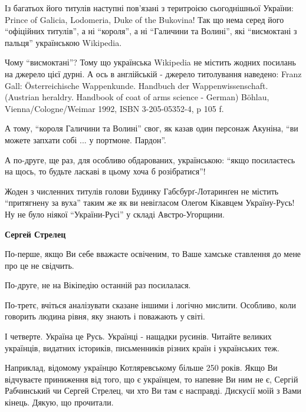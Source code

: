 \begin{itemize}
\begin{itemize}
Із багатьох його титулів наступні пов’язані з теритроією сьогоднішньої України:
Prince of Galicia, Lodomeria, Duke of the Bukovina! Так що нема серед його
\enquote{офіційних титулів}, а ні \enquote{короля}, а ні \enquote{Галичини та Волині}, які \enquote{висмоктані
з пальця} українською Wikipedia.

Чому \enquote{висмоктані}? Тому що українська Wikipedia не містить жодних посилань на
джерело цієї дурні. А ось в англійській - джерело титолування наведено: Franz
Gall: Österreichische Wappenkunde. Handbuch der Wappenwissenschaft. (Austrian
heraldry. Handbook of coat of arms science - German) Böhlau,
Vienna/Cologne/Weimar 1992, ISBN 3-205-05352-4, p 105 f.

А тому, \enquote{короля Галичини та Волині} свог, як казав один персонаж
Акуніна, \enquote{ви можете запхати собі ... у портмоне. Пардон}.

А по-друге, ще раз, для особливо обдарованих, українською: “якщо посилаєтесь на
щось, то будьте ласкаві в цьому хоча б розібратися”!

Жоден з численних титулів голови Будинку Габсбурґ-Лотаринґен не містить
\enquote{притягнену за вуха} таким же як ви невігласом Олегом Кікавцем Україну-Русь! Ну
не було ніякої \enquote{України-Русі} у складі Австро-Угорщини.

 
\textbf{Сергей Стрелец} 

По-перше, якщо Ви себе вважаєте освіченим, то Ваше хамське ставлення до мене
про це не свідчить. 

По-друге, не на Вікіпедію останній раз посилалася. 

По-третє, вчіться аналізувати сказане іншими і логічно мислити. Особливо, коли
говорить людина рівня, яку знають і поважають у світі. 

І четверте. Україна це Русь. Українці - нащадки русинів. Читайте великих
українців, видатних істориків, письменників різних країн і українських теж.

Наприклад, відомому українцю Котляревському більше 250 років. Якщо Ви
відчуваєте приниження від того, що є українцем, то напевне Ви ним не є, Сергій
Рабчинський чи Сергей Стрелец, чи хто Ви там є насправді. Дискусії моїй з Вами
кінець. Дякую, що прочитали.



\end{itemize}
\end{itemize}
